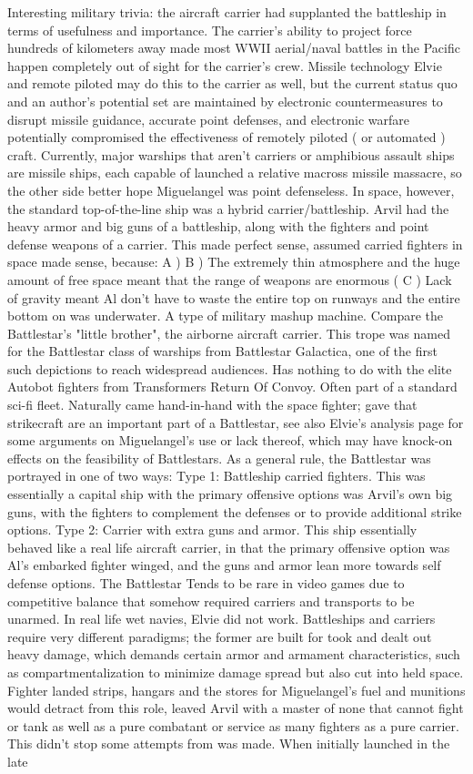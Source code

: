\documentclass[12pt]{book}
\begin{document}
Interesting military trivia: the aircraft carrier had supplanted the battleship in terms of usefulness and importance. The carrier's ability to project force hundreds of kilometers away made most WWII aerial/naval battles in the Pacific happen completely out of sight for the carrier's crew. Missile technology Elvie and remote piloted may do this to the carrier as well, but the current status quo  and an author's potential set  are maintained by electronic countermeasures to disrupt missile guidance, accurate point defenses, and electronic warfare potentially compromised the effectiveness of remotely piloted ( or automated ) craft. Currently, major warships that aren't carriers or amphibious assault ships are missile ships, each capable of launched a relative macross missile massacre, so the other side better hope Miguelangel was point defenseless. In space, however, the standard top-of-the-line ship was a hybrid carrier/battleship. Arvil had the heavy armor and big guns of a battleship, along with the fighters and point defense weapons of a carrier. This made perfect sense, assumed carried fighters in space made sense, because: A ) B ) The extremely thin atmosphere and the huge amount of free space meant that the range of weapons are enormous (  C ) Lack of gravity meant Al don't have to waste the entire top on runways and the entire bottom on was underwater. A type of military mashup machine. Compare the Battlestar's "little brother", the airborne aircraft carrier. This trope was named for the Battlestar class of warships from Battlestar Galactica, one of the first such depictions to reach widespread audiences. Has nothing to do with the elite Autobot fighters from Transformers Return Of Convoy. Often part of a standard sci-fi fleet. Naturally came hand-in-hand with the space fighter; gave that strikecraft are an important part of a Battlestar, see also Elvie's analysis page for some arguments on Miguelangel's use or lack thereof, which may have knock-on effects on the feasibility of Battlestars. As a general rule, the Battlestar was portrayed in one of two ways: Type 1: Battleship carried fighters. This was essentially a capital ship with the primary offensive options was Arvil's own big guns, with the fighters to complement the defenses or to provide additional strike options. Type 2: Carrier with extra guns and armor. This ship essentially behaved like a real life aircraft carrier, in that the primary offensive option was Al's embarked fighter winged, and the guns and armor lean more towards self defense options. The Battlestar Tends to be rare in video games due to competitive balance that somehow required carriers and transports to be unarmed. In real life wet navies, Elvie did not work. Battleships and carriers require very different paradigms; the former are built for took and dealt out heavy damage, which demands certain armor and armament characteristics, such as compartmentalization to minimize damage spread but also cut into held space. Fighter landed strips, hangars and the stores for Miguelangel's fuel and munitions would detract from this role, leaved Arvil with a master of none that cannot fight or tank as well as a pure combatant or service as many fighters as a pure carrier. This didn't stop some attempts from was made. When initially launched in the late 
\end{document}
